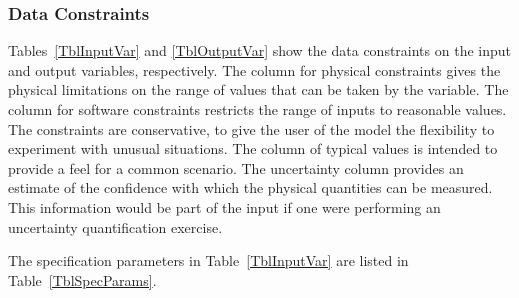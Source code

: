 \documentclass[12pt]{article}
\begin{document}
	
	
	\subsubsection{Data Constraints} \label{sec_DataConstraints}    
	
	Tables~\ref{TblInputVar} and \ref{TblOutputVar} show the data constraints on the
	input and output variables, respectively.  The column for physical constraints gives
	the physical limitations on the range of values that can be taken by the
	variable.  The column for software constraints restricts the range of inputs to
	reasonable values.  The constraints are conservative, to give the user of the
	model the flexibility to experiment with unusual situations.  The column of
	typical values is intended to provide a feel for a common scenario.  The
	uncertainty column provides an estimate of the confidence with which the
	physical quantities can be measured.  This information would be part of the
	input if one were performing an uncertainty quantification exercise.
	
	The specification parameters in Table~\ref{TblInputVar} are listed in
	Table~\ref{TblSpecParams}.
	
\end{document}
